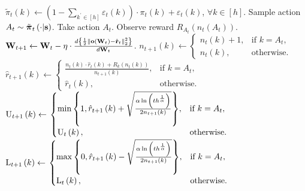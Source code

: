 \begin{algorithm}[t]
\begin{algorithmic}
		\STATE $\tilde{\pi}_t\left(k\right) \gets \left( 1 - \sum\limits_{k^\prime \in [h]}{\varepsilon_t\left(k\right)} \right) \cdot  \pi_t\left(k\right) + \varepsilon_t\left(k\right)$, $\forall k \in [h]$.
		\STATE Sample action $A_{t} \sim \tilde{{\boldsymbol{\pi}}}_t\left(\cdot \middle| {\mathbf{s}} \right)$. Take action $A_{t}$. Observe reward $R_{ A_{t}}\left(n_{t}\left(A_t\right) \right)$.
		\STATE ${\mathbf{W}}_{t+1} \leftarrow {\mathbf{W}}_t - \eta \cdot \frac{d \left\{ \frac{1}{2} \left\| {\mathbf{o}}\left( {\mathbf{W}}_t\right) - \hat{{\mathbf{r}}}_t \right\|_2^2 \right\}}{d {\mathbf{W}}_t}$.
		\STATE $n_{t+1}\left(k\right) \gets \left. 
		    \begin{cases}
		    n_{t}\left(k\right) + 1, & \text{if } k = A_t, \\
		    n_{t}\left(k\right), & \text{otherwise}.
		    \end{cases}
		    \right.$
		\STATE $\hat{r}_{t+1}\left(k\right) \gets \left. 
		    \begin{cases}
		    \frac{n_{t}\left(k\right) \cdot \hat{r}_{t}\left(k\right) + R_{k}\left(n_{t}\left(k\right)\right) }{n_{t+1}\left(k\right)}, & \text{if } k = A_t, \\
		    \hat{r}_{t}\left(k\right), & \text{otherwise}.
		    \end{cases}
		    \right.$
		\STATE ${\text{U}}_{t+1}\left(k\right) \gets \left. 
		    \begin{cases}
		    \min{\left\{ 1, \hat{r}_{t+1}\left(k\right) + \sqrt{\frac{\alpha \ln{\left( t h^{\frac{1}{\alpha}}\right)}}{2 n_{t+1}\left(k\right)}}\right\}}, & \text{if } k = A_t, \\
		    {\text{U}}_{t}\left(k\right), & \text{otherwise}.
		    \end{cases}
		    \right.$
		\STATE ${\text{L}}_{t+1}\left(k\right) \gets \left. 
		    \begin{cases}
		    \max{\left\{ 0, \hat{r}_{t+1}\left(k\right) - \sqrt{\frac{\alpha \ln{\left( t h^{\frac{1}{\alpha}}\right)}}{2 n_{t+1}\left(k\right)}}\right\}}, & \text{if } k = A_t, \\
		    {\text{L}}_{t}\left(k\right), & \text{otherwise}.
		    \end{cases}
		    \right.$
		\ENDFOR
	\end{algorithmic}
\end{algorithm}

